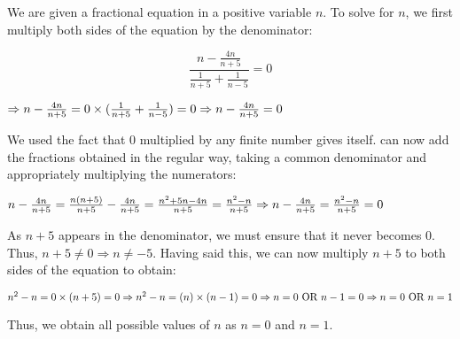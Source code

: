 We are given a fractional equation in a positive variable \(n\). To solve for \(n\), we first multiply both sides of the equation by the denominator:

\[\frac{n-\frac{4n}{n+5}}{\frac{1}{n+5}+\frac{1}{n-5}}=0\]

\(
  \Rightarrow n-\frac{4n}{n+5} = 0\times(\frac{1}{n+5}+\frac{1}{n-5}) = 0
  \\
  \Rightarrow n-\frac{4n}{n+5} = 0
\)

We used the fact that 0 multiplied by any finite number gives itself. can now add the fractions obtained in the regular way, taking a common denominator and appropriately multiplying the numerators:

\(
n-\frac{4n}{n+5} = \frac{n(n+5)}{n+5} - \frac{4n}{n+5} = \frac{n^2 +5n - 4n}{n+5} = \frac{n^2 - n}{n+5}
\\ 
\Rightarrow n-\frac{4n}{n+5} = \frac{n^2 - n}{n+5} = 0
\)

As \(n+5\) appears in the denominator, we must ensure that it never becomes 0.\\ 
Thus, \(n+5 \neq 0 \Rightarrow n \neq -5\). Having said this, we can now multiply \(n+5\) to both sides of the equation to obtain:

\(n^2 - n = 0 \times (n+5) = 0
\\
\Rightarrow n^2 - n = (n)\times(n-1)=0
\\
\Rightarrow n=0 \text{ OR } n-1 = 0
\\
\Rightarrow n=0 \text{ OR } n=1
\)

Thus, we obtain all possible values of \(n\) as \(n=0\) and \(n=1\).

